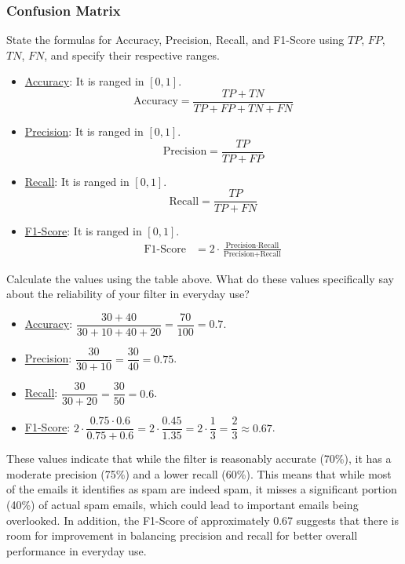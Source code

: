 \subsubsection*{Confusion Matrix}
\begin{ejercicio}
    State the formulas for Accuracy, Precision, Recall, and F1-Score using $TP$, $FP$, $TN$, $FN$, and specify their respective ranges.
    \begin{itemize}
        \item \ul{Accuracy}: It is ranged in $[0, 1]$.
        \begin{equation*}
            \text{Accuracy} = \frac{TP + TN}{TP + FP + TN + FN}
        \end{equation*}
        \item \ul{Precision}: It is ranged in $[0, 1]$.
        \begin{equation*}
            \text{Precision} = \frac{TP}{TP + FP}
        \end{equation*}
        \item \ul{Recall}: It is ranged in $[0, 1]$.
        \begin{equation*}
            \text{Recall} = \frac{TP}{TP + FN}
        \end{equation*}
        \item \ul{F1-Score}: It is ranged in $[0, 1]$.
        \begin{align*}
            \text{F1-Score} &= 2 \cdot \frac{\text{Precision} \cdot \text{Recall}}{\text{Precision} + \text{Recall}}
        \end{align*}
    \end{itemize}
\end{ejercicio}
\begin{ejercicio}
    Calculate the values using the table above. What do these values specifically say about the reliability of your filter in everyday use?
    \begin{itemize}
        \item \ul{Accuracy}: $\dfrac{30 + 40}{30 + 10 + 40 + 20} = \dfrac{70}{100} = 0.7$.
        \item \ul{Precision}: $\dfrac{30}{30 + 10} = \dfrac{30}{40} = 0.75$.
        \item \ul{Recall}: $\dfrac{30}{30 + 20} = \dfrac{30}{50} = 0.6$.
        \item \ul{F1-Score}: $2 \cdot \dfrac{0.75 \cdot 0.6}{0.75 + 0.6} = 2 \cdot \dfrac{0.45}{1.35} = 2 \cdot \dfrac{1}{3} = \dfrac{2}{3} \approx 0.67$.
    \end{itemize}

    These values indicate that while the filter is reasonably accurate (70\%), it has a moderate precision (75\%) and a lower recall (60\%). This means that while most of the emails it identifies as spam are indeed spam, it misses a significant portion (40\%) of actual spam emails, which could lead to important emails being overlooked. In addition, the F1-Score of approximately 0.67 suggests that there is room for improvement in balancing precision and recall for better overall performance in everyday use.
\end{ejercicio}

